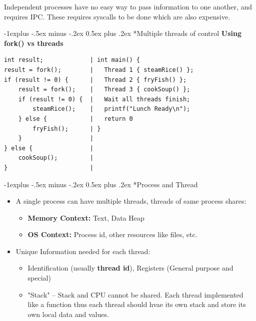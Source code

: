 \documentclass[10pt,landscape]{article}
\makeatletter
\renewcommand{\subsection}{\@startsection{section}{1}{0mm}%
                                {-1ex plus -.5ex minus -.2ex}%
                                {0.5ex plus .2ex}%
                                {\normalfont\large\bfseries}}
\renewcommand{\subsection}{\@startsection{subsection}{2}{0mm}%
                                {-1explus -.5ex minus -.2ex}%
                                {0.5ex plus .2ex}%
                                {\normalfont\normalsize\bfseries}}
\makeatother
\begin{document}
\begin{multicols*}{3}
Independent processes have no easy way to pass information to one another,
and requires IPC. These requires syscalls to be done which are also expensive.

\subsection*{Multiple threads of control}
\textbf{Using fork() vs threads}
\begin{lstlisting}
int result;             | int main() {
result = fork();        |   Thread 1 { steamRice() };
if (result != 0) {      |   Thread 2 { fryFish() };
    result = fork();    |   Thread 3 { cookSoup() };
    if (result != 0) {  |   Wait all threads finish;
        steamRice();    |   printf("Lunch Ready\n");
    } else {            |   return 0
        fryFish();      | }
    }                   |
} else {                |
    cookSoup();         |
}                       |
\end{lstlisting} 

\subsection*{Process and Thread}
\begin{itemize}[topsep=0pt,noitemsep,wide=0pt, leftmargin=\dimexpr{} + 2\relax]
    \item A single process can have multiple threads, threads of same process shares:
    \begin{itemize}[topsep=0pt,noitemsep,wide=0pt, leftmargin=\dimexpr{} + 2\relax]
        \item \textbf{Memory Context:} Text, Data Heap
        \item \textbf{OS Context:} Process id, other resources like files, etc.
    \end{itemize}
    \item Unique Information needed for each thread:
    \begin{itemize}[topsep=0pt,noitemsep,wide=0pt, leftmargin=\dimexpr{} + 2\relax]
        \item Identification (usually \textbf{thread id}), Registers (General purpose and special)
        \item "Stack" -- Stack and CPU cannot be shared. Each thread implemented like a function
        thus each thread should hvae its own stack and store its own local data and values.
    \end{itemize} 
\end{itemize}


\end{multicols*}
\end{document}
